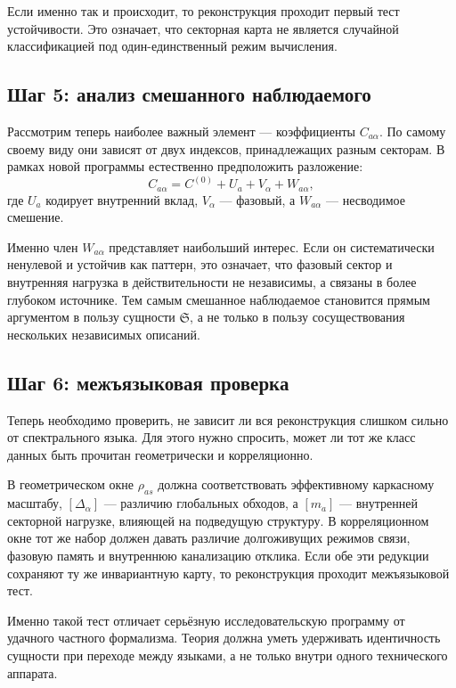 \documentclass[12pt,a4paper]{article}
\begin{document}
Если именно так и происходит, то реконструкция проходит первый тест устойчивости. Это означает, что секторная карта не является случайной классификацией под один-единственный режим вычисления.

\subsection{Шаг 5: анализ смешанного наблюдаемого}

Рассмотрим теперь наиболее важный элемент --- коэффициенты \(C_{a\alpha}\). По самому своему виду они зависят от двух индексов, принадлежащих разным секторам. В рамках новой программы естественно предположить разложение:
\begin{equation}
C_{a\alpha} = C^{(0)} + U_a + V_{\alpha} + W_{a\alpha},
\end{equation}
где \(U_a\) кодирует внутренний вклад, \(V_{\alpha}\) --- фазовый, а \(W_{a\alpha}\) --- несводимое смешение.

Именно член \(W_{a\alpha}\) представляет наибольший интерес. Если он систематически ненулевой и устойчив как паттерн, это означает, что фазовый сектор и внутренняя нагрузка в действительности не независимы, а связаны в более глубоком источнике. Тем самым смешанное наблюдаемое становится прямым аргументом в пользу сущности \(\mathfrak{S}\), а не только в пользу сосуществования нескольких независимых описаний.

\subsection{Шаг 6: межъязыковая проверка}

Теперь необходимо проверить, не зависит ли вся реконструкция слишком сильно от спектрального языка. Для этого нужно спросить, может ли тот же класс данных быть прочитан геометрически и корреляционно.

В геометрическом окне \(\rho_{as}\) должна соответствовать эффективному каркасному масштабу, \([\Delta_{\alpha}]\) --- различию глобальных обходов, а \([m_a]\) --- внутренней секторной нагрузке, влияющей на подведущую структуру. В корреляционном окне тот же набор должен давать различие долгоживущих режимов связи, фазовую память и внутреннюю канализацию отклика. Если обе эти редукции сохраняют ту же инвариантную карту, то реконструкция проходит межъязыковой тест.

Именно такой тест отличает серьёзную исследовательскую программу от удачного частного формализма. Теория должна уметь удерживать идентичность сущности при переходе между языками, а не только внутри одного технического аппарата.
\end{document}
